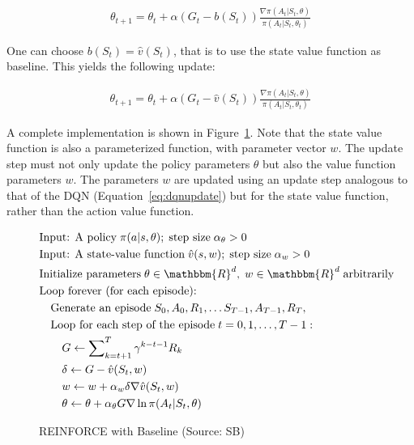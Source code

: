 \begin{align*}
\theta_{t+1} = \theta_t + \alpha(G_t - b(S_t)) \frac{\nabla \pi(A_t | S_t, \theta)}{\pi(A_t | S_t, \theta_t)}
\end{align*}

One can choose $b(S_t) = \hat{v}(S_t)$, that is to use the state value function as baseline. This yields the following update:

\begin{align*}
\theta_{t+1} = \theta_t + \alpha(G_t - \hat{v}(S_t)) \frac{\nabla \pi(A_t | S_t, \theta)}{\pi(A_t | S_t, \theta_t)}
\end{align*}

A complete implementation is shown in Figure~\ref{fig:reinforcebaseline}. Note that the state value function is also a parameterized function, with parameter vector $w$. The update step must not only update the policy parameters $\theta$ but also the value function parameters $w$. The parameters $w$ are updated using an update step analogous to that of the DQN (Equation~\ref{eq:dqnupdate}) but for the state value function, rather than the action value function.

\begin{figure}
\small
\begin{tcolorbox}[colback=code]
\vspace{-\baselineskip}
\begin{align*}
& \text{Input: A policy}\;\pi(a | s, \theta);\;\text{step size}\; \alpha_\theta > 0 \\
& \text{Input: A state-value function}\;\hat{v}(s, w);\;\text{step size}\; \alpha_w > 0 \\
& \text{Initialize parameters}\; \theta \in \mathbbm{R}^d,\; w \in \mathbbm{R}^d\;\text{arbitrarily} \\
& \text{Loop forever (for each episode):} \\
& \quad \text{Generate an episode}\; S_0, A_0, R_1, \ldots S_{T-1}, A_{T-1}, R_T, \hspace{1in} \\
& \quad \text{Loop for each step of the episode}\;t=0, 1, \ldots, T-1:\\
& \quad \quad G \leftarrow \sum\nolimits_{k=t+1}^T \gamma^{k - t - 1}R_k \\
& \quad \quad \delta \leftarrow G - \hat{v}(S_t, w) \\
& \quad \quad w \leftarrow w + \alpha_w \delta \nabla \hat{v}(S_t, w) \\
& \quad \quad \theta \leftarrow \theta + \alpha_\theta G \nabla \ln \pi(A_t | S_t, \theta)
\end{align*}
\end{tcolorbox}
\caption[REINFORCE with Baseline]{REINFORCE with Baseline (Source: SB)}
\label{fig:reinforcebaseline}
\end{figure}

